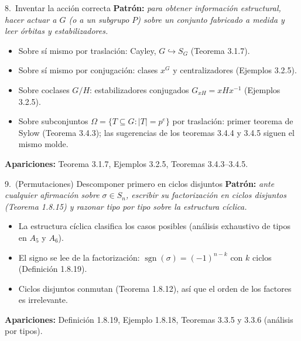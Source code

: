 \documentclass[11pt,twoside]{article}
\DeclareMathOperator{\sgn}{sgn}
\begin{document}
\begin{strategybox}{8.\ Inventar la acción correcta}
\textbf{Patrón:} \textit{para obtener información estructural, hacer actuar a $G$ (o a un subgrupo $P$) sobre un conjunto fabricado a medida y leer órbitas y estabilizadores.}
\begin{itemize}[leftmargin=1.5em]
\item Sobre sí mismo por traslación: Cayley, $G \hookrightarrow S_{G}$ (Teorema 3.1.7).
\item Sobre sí mismo por conjugación: clases $x^{G}$ y centralizadores (Ejemplos 3.2.5).
\item Sobre coclases $G/H$: estabilizadores conjugados $G_{xH} = xHx^{-1}$ (Ejemplos 3.2.5).
\item Sobre subconjuntos $\Omega = \{ T \subseteq G : \lvert T \rvert = p^{e} \}$ por traslación: primer teorema de Sylow (Teorema 3.4.3); las sugerencias de los teoremas 3.4.4 y 3.4.5 siguen el mismo molde.
\end{itemize}
\textbf{Apariciones:} Teorema 3.1.7, Ejemplos 3.2.5, Teoremas 3.4.3–3.4.5.
\end{strategybox}

\begin{strategybox}{9.\ (Permutaciones) Descomponer primero en ciclos disjuntos}
\textbf{Patrón:} \textit{ante cualquier afirmación sobre $\sigma \in S_{n}$, escribir su factorización en ciclos disjuntos (Teorema 1.8.15) y razonar tipo por tipo sobre la estructura cíclica.}
\begin{itemize}[leftmargin=1.5em]
\item La estructura cíclica clasifica los casos posibles (análisis exhaustivo de tipos en $A_{5}$ y $A_{6}$).
\item El signo se lee de la factorización: $\sgn(\sigma) = (-1)^{n-k}$ con $k$ ciclos (Definición 1.8.19).
\item Ciclos disjuntos conmutan (Teorema 1.8.12), así que el orden de los factores es irrelevante.
\end{itemize}
\textbf{Apariciones:} Definición 1.8.19, Ejemplo 1.8.18, Teoremas 3.3.5 y 3.3.6 (análisis por tipos).
\end{strategybox}
\end{document}
